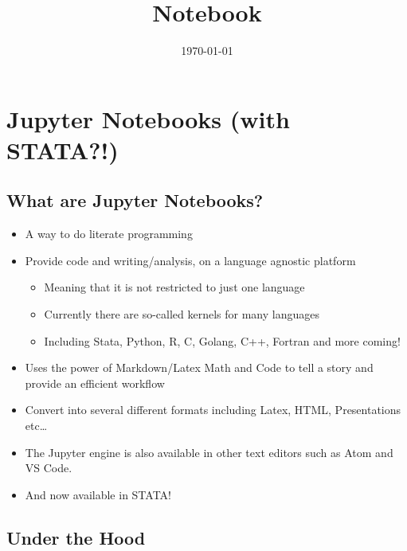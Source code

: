 \documentclass[10pt,parskip=half,
	toc=sectionentrywithdots,
	bibliography=totocnumbered,
	captions=tableheading,numbers=noendperiod]{scrartcl}
\providecommand{\tightlist}{%
  \setlength{\itemsep}{0pt}\setlength{\parskip}{0pt}}
\begin{document}
		\title{Notebook}
	\date{\today}
	\maketitle

		\begingroup
    \let\cleardoublepage\relax
    \let\clearpage\relax\tableofcontents
    \endgroup

\hypertarget{jupyter-notebooks-with-stata}{%
\section{Jupyter Notebooks (with
STATA?!)}\label{jupyter-notebooks-with-stata}}

\hypertarget{what-are-jupyter-notebooks}{%
\subsection{What are Jupyter
Notebooks?}\label{what-are-jupyter-notebooks}}

\begin{itemize}
\tightlist
\item
  A way to do literate programming
\item
  Provide code and writing/analysis, on a language agnostic platform

  \begin{itemize}
  \tightlist
  \item
    Meaning that it is not restricted to just one language
  \item
    Currently there are so-called kernels for many languages
  \item
    Including Stata, Python, R, C, Golang, C++, Fortran and more coming!
  \end{itemize}
\item
  Uses the power of Markdown/Latex Math and Code to tell a story and
  provide an efficient workflow
\item
  Convert into several different formats including Latex, HTML,
  Presentations etc\ldots{}
\item
  The Jupyter engine is also available in other text editors such as
  Atom and VS Code.
\item
  And now available in STATA!
\end{itemize}

\hypertarget{under-the-hood}{%
\subsection{Under the Hood}\label{under-the-hood}}
\end{document}
